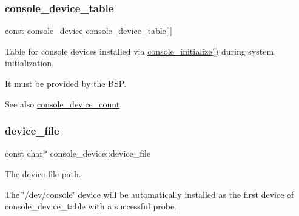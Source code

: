 \subsubsection{\texorpdfstring{console\_device\_table}{console\_device\_table}}
{\footnotesize\ttfamily const \mbox{\hyperlink{structconsole__device}{console\+\_\+device}} console\+\_\+device\+\_\+table\mbox{[}$\,$\mbox{]}}



Table for console devices installed via \mbox{\hyperlink{arm_2raspberrypi_2console_2console-config_8c_a4bdc321ef3ab62a261d77b5dbe075566}{console\+\_\+initialize()}} during system initialization. 

It must be provided by the B\+SP.

\begin{DoxySeeAlso}{See also}
\mbox{\hyperlink{group__ConsoleTermios_gabca2c9c9873b0482f9fd306e6bade017}{console\+\_\+device\+\_\+count}}. 
\end{DoxySeeAlso}
\mbox{\label{group__ConsoleTermios_ga0e92b47597259fb578d5a651d91255ea}} 
\subsubsection{\texorpdfstring{device\_file}{device\_file}}
{\footnotesize\ttfamily const char$\ast$ console\+\_\+device\+::device\+\_\+file}



The device file path. 

The \char`\"{}/dev/console\char`\"{} device will be automatically installed as the first device of console\+\_\+device\+\_\+table with a successful probe. 